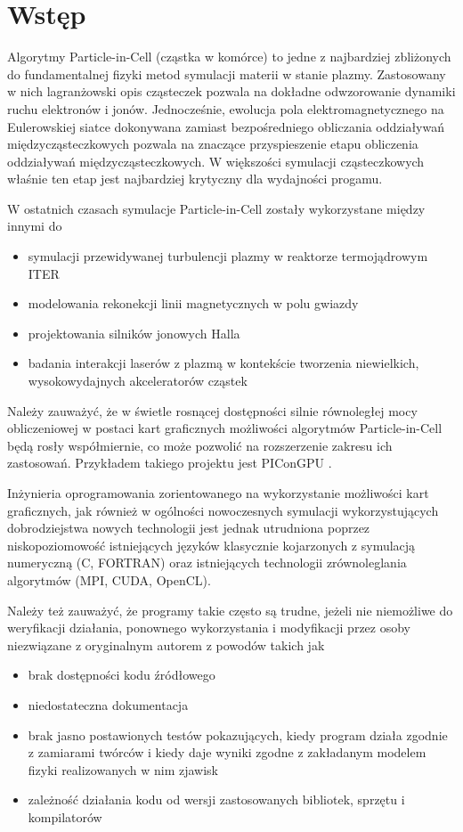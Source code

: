 \section[Wstęp]{Wstęp} %
Algorytmy Particle-in-Cell (cząstka w komórce) to jedne z najbardziej
zbliżonych do fundamentalnej fizyki metod symulacji materii w stanie plazmy.
Zastosowany w nich lagranżowski opis cząsteczek pozwala na dokładne
odwzorowanie dynamiki ruchu elektronów i jonów. Jednocześnie, ewolucja pola
elektromagnetycznego na Eulerowskiej siatce dokonywana zamiast bezpośredniego
obliczania oddziaływań międzycząsteczkowych pozwala na znaczące przyspieszenie
etapu obliczenia oddziaływań międzycząsteczkowych. W większości symulacji
cząsteczkowych właśnie ten etap jest najbardziej krytyczny dla wydajności
progamu.

W ostatnich czasach symulacje Particle-in-Cell zostały wykorzystane między innymi do
\begin{itemize}
\item symulacji przewidywanej turbulencji plazmy w reaktorze termojądrowym ITER \cite{pic-hammett}
\item modelowania rekonekcji linii magnetycznych w polu gwiazdy \cite{pic-reconnection}
\item projektowania silników jonowych Halla \cite{pic-hallengine}
\item badania interakcji laserów z plazmą w kontekście tworzenia niewielkich,
    wysokowydajnych akceleratorów cząstek \cite{pic-laserplasma}
\end{itemize}

Należy zauważyć, że w świetle rosnącej dostępności silnie równoległej mocy
obliczeniowej w postaci kart graficznych możliwości algorytmów Particle-in-Cell
będą rosły współmiernie, co może pozwolić na rozszerzenie zakresu ich
zastosowań.  Przykładem takiego projektu jest PIConGPU \cite{picongpu}.

Inżynieria oprogramowania zorientowanego na wykorzystanie możliwości kart
graficznych, jak również w ogólności nowoczesnych symulacji wykorzystujących
dobrodziejstwa nowych technologii jest jednak utrudniona poprzez
niskopoziomowość istniejących języków klasycznie kojarzonych z symulacją
numeryczną (C, FORTRAN) oraz istniejących technologii zrównoleglania algorytmów
(MPI, CUDA, OpenCL).

Należy też zauważyć, że programy takie często są
trudne, jeżeli nie niemożliwe do weryfikacji działania, ponownego wykorzystania
i modyfikacji przez osoby niezwiązane z oryginalnym autorem z powodów takich jak
\begin{itemize}
    \item brak dostępności kodu źródłowego
    \item niedostateczna dokumentacja
    \item brak jasno postawionych testów pokazujących, kiedy program działa
    zgodnie z zamiarami twórców i kiedy daje wyniki zgodne z zakładanym
    modelem fizyki realizowanych w nim zjawisk
    \item zależność działania kodu od wersji zastosowanych bibliotek, sprzętu i kompilatorów
\end{itemize}


